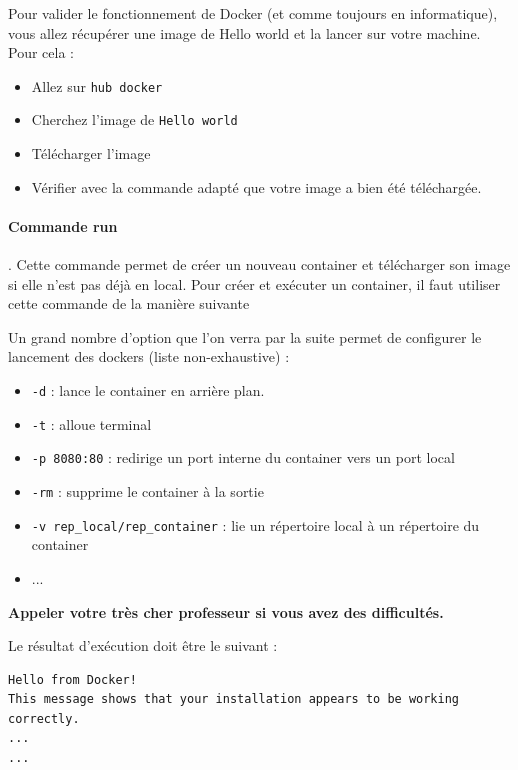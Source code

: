 \documentclass[french, 12pt]{article}%
\newcommand{\itemE}{\item[$\bullet$]}
\begin{document}
Pour valider le fonctionnement de Docker (et comme toujours en informatique), vous allez récupérer une image de Hello world et la lancer sur votre machine. Pour cela : 

\begin{itemize}
\itemE Allez sur \verb?hub docker?
\itemE Cherchez l'image de \verb?Hello world?
\itemE Télécharger l'image
\end{itemize}


\begin{itemize}
\itemE Vérifier avec la commande adapté que votre image a bien été téléchargée.
\end{itemize}


\paragraph{Commande run}. Cette commande permet de créer un nouveau container et télécharger son image si elle n’est pas déjà en local. Pour créer et exécuter un container, il faut utiliser cette commande de la manière suivante 


Un grand nombre d'option que l'on verra par la suite permet de configurer le lancement des dockers (liste non-exhaustive) :
\begin{itemize}
\itemE \verb?-d? : lance le container en arrière plan.
\itemE \verb?-t? : alloue terminal
\itemE \verb?-p 8080:80? : redirige un port interne du container vers un port
local
\itemE \verb?-rm? : supprime le container à la sortie
\itemE \verb?-v rep_local/rep_container? : lie un répertoire local à un répertoire du container
\itemE ...
\end{itemize}



\textbf{Appeler votre très cher professeur si vous avez des difficultés.}

\vspace{0.5cm}

Le résultat d'exécution doit être le suivant :  

\begin{lstlisting}
Hello from Docker!
This message shows that your installation appears to be working correctly.
...
...
\end{lstlisting}
\end{document}
